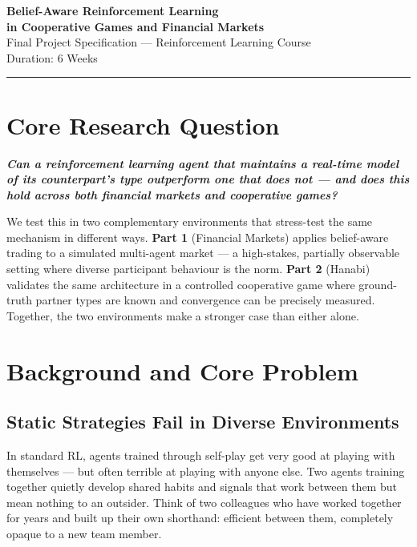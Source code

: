 \documentclass[11pt, a4paper]{article}
\begin{document}
\begin{center}
    {\LARGE\bfseries\color{accentblue} Belief-Aware Reinforcement Learning}\\[4pt]
    {\LARGE\bfseries\color{accentblue} in Cooperative Games and Financial Markets}\\[16pt]
    {\large\color{darkgray} Final Project Specification --- Reinforcement Learning Course}\\[6pt]
    {\normalsize\color{darkgray} Duration: 6 Weeks}
\end{center}

\vspace{4pt}
\noindent\color{rulecolor}\rule{\linewidth}{1.5pt}
\vspace{8pt}

\section{Core Research Question}

\textit{\textbf{Can a reinforcement learning agent that maintains a real-time model of its counterpart's type outperform one that does not --- and does this hold across both financial markets and cooperative games?}}

We test this in two complementary environments that stress-test the same mechanism in different ways. \textbf{Part 1} (Financial Markets) applies belief-aware trading to a simulated multi-agent market --- a high-stakes, partially observable setting where diverse participant behaviour is the norm. \textbf{Part 2} (Hanabi) validates the same architecture in a controlled cooperative game where ground-truth partner types are known and convergence can be precisely measured. Together, the two environments make a stronger case than either alone.

\section{Background and Core Problem}

\subsection{Static Strategies Fail in Diverse Environments}

In standard RL, agents trained through self-play get very good at playing with themselves --- but often terrible at playing with anyone else. Two agents training together quietly develop shared habits and signals that work between them but mean nothing to an outsider. Think of two colleagues who have worked together for years and built up their own shorthand: efficient between them, completely opaque to a new team member.
\end{document}
